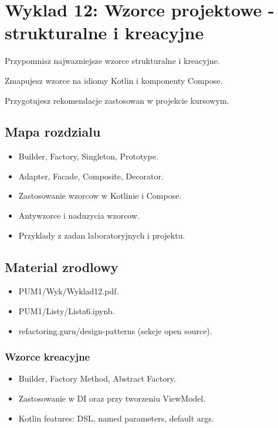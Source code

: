 \chapter{Wyklad 12: Wzorce projektowe - strukturalne i kreacyjne}

\begin{learningobjectives}
  \item Przypomnisz najwazniejsze wzorce strukturalne i kreacyjne.
  \item Zmapujesz wzorce na idiomy Kotlin i komponenty Compose.
  \item Przygotujesz rekomendacje zastosowan w projekcie kursowym.
\end{learningobjectives}

\section{Mapa rozdzialu}
\begin{itemize}
  \item Builder, Factory, Singleton, Prototype.
  \item Adapter, Facade, Composite, Decorator.
  \item Zastosowanie wzorcow w Kotlinie i Compose.
  \item Antywzorce i naduzycia wzorcow.
  \item Przyklady z zadan laboratoryjnych i projektu.
\end{itemize}

\section{Material zrodlowy}
\begin{itemize}
  \item PUM1/Wyk/Wyklad12.pdf.
  \item PUM1/Listy/Lista6.ipynb.
  \item refactoring.guru/design-patterns (sekcje open source).
\end{itemize}

\subsection{Wzorce kreacyjne}
\begin{itemize}
  \item Builder, Factory Method, Abstract Factory.
  \item Zastosowanie w DI oraz przy tworzeniu ViewModel.
  \item Kotlin features: DSL, named parameters, default args.
\end{itemize}

